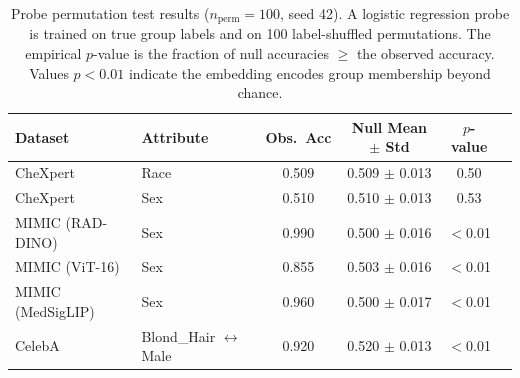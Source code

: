 \begin{table}[ht]
\centering
\scriptsize
\renewcommand{\arraystretch}{1.2}
\caption{Probe permutation test results ($n_{\mathrm{perm}}{=}100$, seed 42). A logistic regression probe is trained on true group labels and on 100 label-shuffled permutations. The empirical $p$-value is the fraction of null accuracies $\geq$ the observed accuracy. Values $p{<}0.01$ indicate the embedding encodes group membership beyond chance.}
\label{tab:permutation_pvalues}
\begin{tabular}{llcccc}
\hline
\textbf{Dataset} & \textbf{Attribute} & \textbf{Obs.\ Acc} & \textbf{Null Mean $\pm$ Std} & \textbf{$p$-value} \\
\hline
CheXpert & Race & 0.509 & 0.509 $\pm$ 0.013 & 0.50 \\
CheXpert & Sex & 0.510 & 0.510 $\pm$ 0.013 & 0.53 \\
MIMIC (RAD-DINO) & Sex & 0.990 & 0.500 $\pm$ 0.016 & $<$0.01 \\
MIMIC (ViT-16) & Sex & 0.855 & 0.503 $\pm$ 0.016 & $<$0.01 \\
MIMIC (MedSigLIP) & Sex & 0.960 & 0.500 $\pm$ 0.017 & $<$0.01 \\
CelebA & Blond_Hair $\leftrightarrow$ Male & 0.920 & 0.520 $\pm$ 0.013 & $<$0.01 \\
\hline
\end{tabular}
\end{table}
